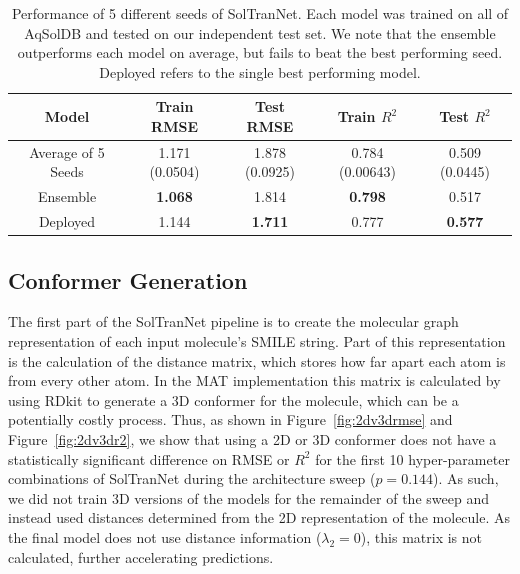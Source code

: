 \documentclass[journal=jmcmar,manuscript=article]{achemso}
\begin{document}
\begin{table}
    \begin{tabular}{|c|c|c|c|c|}
        \hline
        Model & Train RMSE & Test RMSE & Train $R^2$ & Test $R^2$ \\
        \hline
        Average of 5 Seeds & 1.171 (0.0504) & 1.878 (0.0925)  & 0.784 (0.00643) & 0.509 (0.0445)\\
        Ensemble & \textbf{1.068} & 1.814 & \textbf{0.798} & 0.517\\
        Deployed & 1.144 & \textbf{1.711} & 0.777 & \textbf{0.577}\\
        \hline
    \end{tabular}
    \caption{Performance of 5 different seeds of SolTranNet. Each model was trained on all of AqSolDB and tested on our independent test set. We note that the ensemble outperforms each model on average, but fails to beat the best performing seed. Deployed refers to the single best performing model.}
    \label{tab:deployed}
\end{table}

\subsection{Conformer Generation}

The first part of the SolTranNet pipeline is to create the molecular graph representation of each input molecule's SMILE string.
Part of this representation is the calculation of the distance matrix, which stores how far apart each atom is from every other atom.
In the MAT implementation this matrix is calculated by using RDkit to generate a 3D conformer for the molecule, which can be a potentially costly process.
Thus, as shown in Figure~\ref{fig:2dv3drmse} and Figure~\ref{fig:2dv3dr2}, we show that using a 2D or 3D conformer does not have a statistically significant difference on RMSE or $R^2$ for the first 10 hyper-parameter combinations of SolTranNet during the architecture sweep ($p=0.144$).
As such, we did not train 3D versions of the models for the remainder of the sweep and instead used distances determined from the 2D representation of the molecule. 
As the final model does not use distance information ($\lambda_2 = 0$), this matrix is not calculated, further accelerating predictions.
\end{document}
